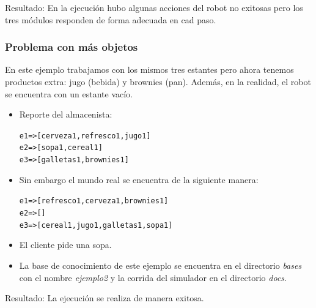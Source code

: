 \documentclass[11pt]{article}
\newcommand{\bt}{\begin{alltt}}
\newcommand{\et}{\end{alltt}}
\begin{document}
Resultado: En la ejecución hubo algunas acciones del robot no
exitosas pero los tres módulos responden de forma adecuada en
cad paso.

\subsubsection{Problema con más objetos}

En este ejemplo trabajamos con los mismos tres estantes pero
ahora tenemos productos extra: jugo (bebida) y brownies (pan).
Además, en la realidad, el robot se encuentra con un estante
vacío.

\begin{itemize}
\item Reporte del almacenista:
  \bt
  e1 => [cerveza1,refresco1,jugo1]
  e2 => [sopa1,cereal1]
  e3 => [galletas1,brownies1]
  \et
\item Sin embargo el mundo real se encuentra de la siguiente manera:
  \bt
  e1 => [refresco1,cerveza1,brownies1]
  e2 => []
  e3 => [cereal1,jugo1,galletas1,sopa1]
  \et
 \item El cliente pide una sopa.
\item La base de conocimiento de este ejemplo se encuentra
  en el directorio \emph{bases} con el nombre \emph{ejemplo2} y la
  corrida del simulador en el directorio \emph{docs}.
\end{itemize}

Resultado: La ejecución se realiza de manera exitosa.
\end{document}
